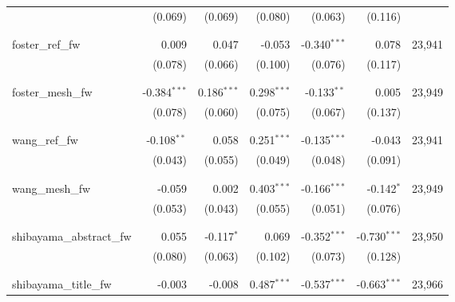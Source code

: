 \begin{table}[h!]
{\begin{threeparttable}
\begin{tabular}{@{\extracolsep{5pt}}lD{.}{.}{-3} D{.}{.}{-3} D{.}{.}{-3} D{.}{.}{-3} D{.}{.}{-3} | D{.}{.}{-3} }
  & (0.069) & (0.069) & (0.080) & (0.063) & (0.116) & \\         
  & & & & & & \\                                                
 \hline \\[-1.8ex]                                                               
 foster\_ref\_fw & 0.009 & 0.047 & -0.053 & -0.340$^{***}$ & 0.078 & 23,941\\   
  & (0.078) & (0.066) & (0.100) & (0.076) & (0.117) & \\           
  & & & & & & \\                
 \hline \\[-1.8ex]                
 foster\_mesh\_fw & -0.384$^{***}$ & 0.186$^{***}$ & 0.298$^{***}$ & -0.133$^{**}$ & 0.005 &23,949 \\                          
  & (0.078) & (0.060) & (0.075) & (0.067) & (0.137) & \\             
  & & & & & & \\                 
 \hline \\[-1.8ex]               
 wang\_ref\_fw & -0.108$^{**}$ & 0.058 & 0.251$^{***}$ & -0.135$^{***}$ & -0.043 & 23,941\\                               
  & (0.043) & (0.055) & (0.049) & (0.048) & (0.091) & \\    
  & & & & & & \\                 
 \hline \\[-1.8ex]                        
 wang\_mesh\_fw & -0.059 & 0.002 & 0.403$^{***}$ & -0.166$^{***}$ & -0.142$^{*}$ & 23,949\\                                              
  & (0.053) & (0.043) & (0.055) & (0.051) & (0.076) & \\      
  & & & & & & \\                           
 \hline \\[-1.8ex]                                     
shibayama\_abstract\_fw & 0.055 & -0.117$^{*}$ & 0.069 & -0.352$^{***}$ & -0.730$^{***}$ & 23,950 \\                 
  & (0.080) & (0.063) & (0.102) & (0.073) & (0.128) & \\   
  & & & & & & \\                 
 \hline \\[-1.8ex]                                                
 shibayama\_title\_fw & -0.003 & -0.008 & 0.487$^{***}$ & -0.537$^{***}$ & -0.663$^{***}$ & 23,966\\                               

\end{tabular}
\end{threeparttable}}
\end{table}
